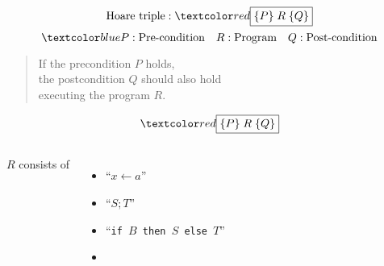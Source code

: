 \begin{frame}{}
  \[
    \text{Hoare triple}: \red{\boxed{\set{P}\; R\; \set{Q}}}
  \]
  \pause
  \[
    \blue{P: \text{Pre-condition} \quad R: \text{Program} \quad Q: \text{Post-condition}}
  \]
  
  \pause
  \vspace{0.6cm}
  \begin{center}
  \end{center}
  
  \vspace{-0.2cm}
  \begin{quote}
    \begin{center}
      If the precondition $P$ holds, \\[8pt]
      the postcondition $Q$ should also hold \\ [8pt]
       executing the program $R$.
    \end{center}
  \end{quote}
  
\end{frame}


\begin{frame}{}
  \[
    \red{\boxed{\set{P}\; R\; \set{Q}}}
  \]
  
  \pause
  \vspace{0.80cm}
  \begin{columns}
      $R$ consists of 
      \begin{itemize}
        \item ``$x \gets a$''
        \item ``$S; T$''
        \item ``\texttt{if $B$ then $S$ else $T$}''
        \item {}
      \end{itemize}
  \end{columns}
\end{frame}

